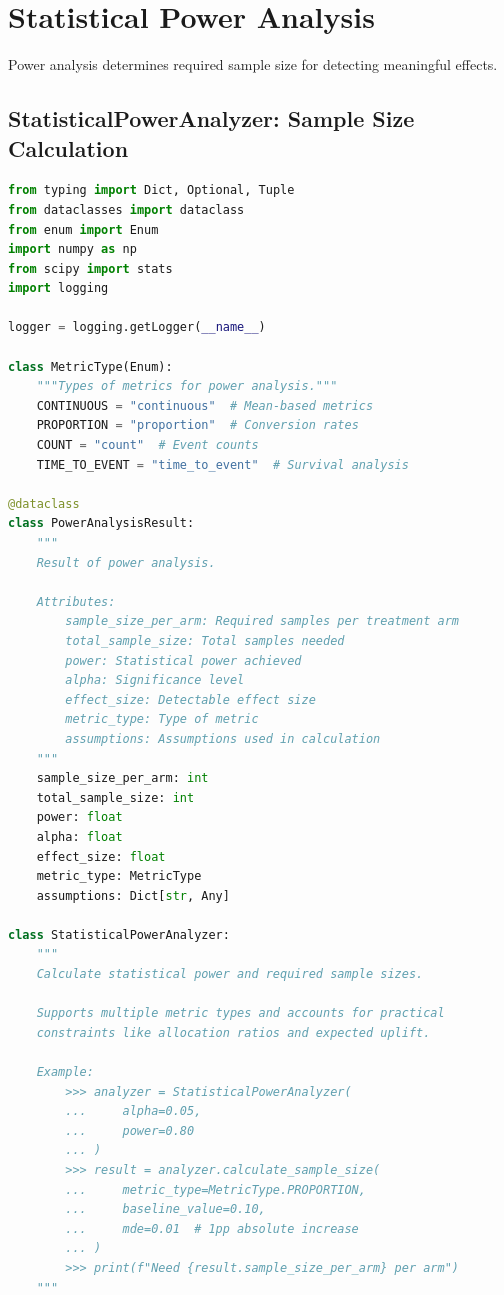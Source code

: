 \section{Statistical Power Analysis}

Power analysis determines required sample size for detecting meaningful effects.

\subsection{StatisticalPowerAnalyzer: Sample Size Calculation}

\begin{lstlisting}[language=Python, caption={Comprehensive Power Analysis}]
from typing import Dict, Optional, Tuple
from dataclasses import dataclass
from enum import Enum
import numpy as np
from scipy import stats
import logging

logger = logging.getLogger(__name__)

class MetricType(Enum):
    """Types of metrics for power analysis."""
    CONTINUOUS = "continuous"  # Mean-based metrics
    PROPORTION = "proportion"  # Conversion rates
    COUNT = "count"  # Event counts
    TIME_TO_EVENT = "time_to_event"  # Survival analysis

@dataclass
class PowerAnalysisResult:
    """
    Result of power analysis.

    Attributes:
        sample_size_per_arm: Required samples per treatment arm
        total_sample_size: Total samples needed
        power: Statistical power achieved
        alpha: Significance level
        effect_size: Detectable effect size
        metric_type: Type of metric
        assumptions: Assumptions used in calculation
    """
    sample_size_per_arm: int
    total_sample_size: int
    power: float
    alpha: float
    effect_size: float
    metric_type: MetricType
    assumptions: Dict[str, Any]

class StatisticalPowerAnalyzer:
    """
    Calculate statistical power and required sample sizes.

    Supports multiple metric types and accounts for practical
    constraints like allocation ratios and expected uplift.

    Example:
        >>> analyzer = StatisticalPowerAnalyzer(
        ...     alpha=0.05,
        ...     power=0.80
        ... )
        >>> result = analyzer.calculate_sample_size(
        ...     metric_type=MetricType.PROPORTION,
        ...     baseline_value=0.10,
        ...     mde=0.01  # 1pp absolute increase
        ... )
        >>> print(f"Need {result.sample_size_per_arm} per arm")
    """


\end{lstlisting}
